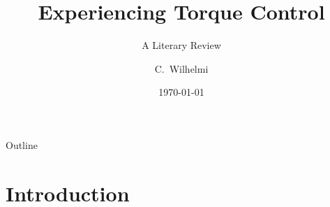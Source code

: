 \documentclass{beamer}
\title[Torque Control] %
{Experiencing Torque Control}
\subtitle
{A Literary Review} %
\author[Wilhelmi] %
{C.~Wilhelmi}%
\institute[George Mason University] %
{
  George Mason University \\
  Fairfax, VA
  
}
\date[ ] %
{\today}
\begin{document}
\begin{frame}
  \titlepage
\end{frame}

\begin{frame}{Outline}
  \tableofcontents
\end{frame}




\section[Introduction]{Introduction}
\end{document}
